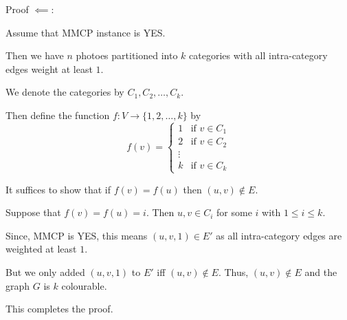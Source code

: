 \begin{questions}
	\begin{soln}
		Proof \(\impliedby\):

		Assume that MMCP instance is YES.

		Then we have \(n\) photoes partitioned into \(k\) categories with all intra-category edges weight at least \(1\).

		We denote the categories by \(C_1, C_2, \dots, C_k\).

		Then define the function \(f:V \to \{1, 2, \dots, k\}\) by
		\[
			f(v) = \begin{cases}
				1 & \text{if } v \in C_1 \\
				2 & \text{if } v \in C_2 \\
				\vdots                   \\
				k & \text{if } v \in C_k
			\end{cases}
		\]

		It suffices to show that if \(f(v) = f(u)\) then \((u, v) \notin E\).

		Suppose that \(f(v) = f(u) = i\). Then \(u, v \in C_i\) for some \(i\) with \(1 \leq i \leq k\).

		Since, MMCP is YES, this means \((u, v, 1) \in E'\) as all intra-category edges are weighted at least \(1\).

		But we only added \((u, v, 1)\) to \(E'\) iff \((u, v) \notin E\). Thus, \((u, v) \notin E\) and the graph \(G\) is \(k\) colourable.

		This completes the proof.

	\end{soln}

\end{questions}
